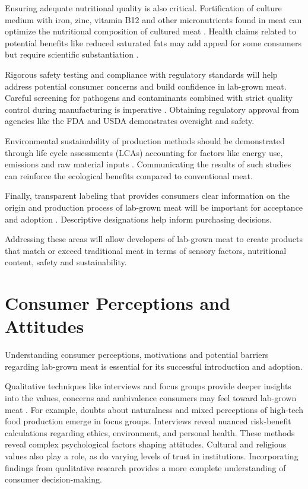 \documentclass[10pt]{article}
\begin{document}
\begin{sloppypar}
  Ensuring adequate nutritional quality is also critical. Fortification of culture medium with iron, zinc, vitamin B12 and other micronutrients found in meat can optimize the nutritional composition of cultured meat \citep{fraeye_sensorial_2020}. Health claims related to potential benefits like reduced saturated fats may add appeal for some consumers but require scientific substantiation \citep{sergelidis_lab_2019}.

  Rigorous safety testing and compliance with regulatory standards will help address potential consumer concerns and build confidence in lab-grown meat. Careful screening for pathogens and contaminants combined with strict quality control during manufacturing is imperative \citep{ong_food_2021}. Obtaining regulatory approval from agencies like the FDA and USDA demonstrates oversight and safety.

  Environmental sustainability of production methods should be demonstrated through life cycle assessments (LCAs) accounting for factors like energy use, emissions and raw material inputs \citep{mattick_anticipatory_2015}. Communicating the results of such studies can reinforce the ecological benefits compared to conventional meat.

  Finally, transparent labeling that provides consumers clear information on the origin and production process of lab-grown meat will be important for acceptance and adoption \citep{failla_evaluation_2023}. Descriptive designations help inform purchasing decisions.

  Addressing these areas will allow developers of lab-grown meat to create products that match or exceed traditional meat in terms of sensory factors, nutritional content, safety and sustainability.

  \section{Consumer Perceptions and Attitudes}
  \label{sec:consumer-perceptions-and-attitudes}

  Understanding consumer perceptions, motivations and potential barriers regarding lab-grown meat is essential for its successful introduction and adoption.

  Qualitative techniques like interviews and focus groups provide deeper insights into the values, concerns and ambivalence consumers may feel toward lab-grown meat \citep{laestadius_is_2015}. For example, doubts about naturalness and mixed perceptions of high-tech food production emerge in focus groups. Interviews reveal nuanced risk-benefit calculations regarding ethics, environment, and personal health. These methods reveal complex psychological factors shaping attitudes. Cultural and religious values also play a role, as do varying levels of trust in institutions. Incorporating findings from qualitative research provides a more complete understanding of consumer decision-making.


\end{sloppypar}
\end{document}
